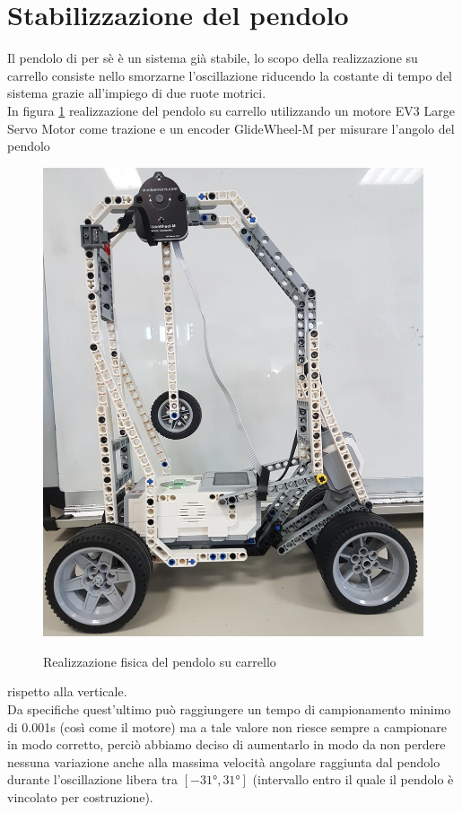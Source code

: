 \section{Stabilizzazione del pendolo}
Il pendolo di per sè è un sistema già stabile, lo scopo della realizzazione su carrello consiste nello smorzarne l'oscillazione riducendo la costante di tempo del sistema grazie all'impiego di due ruote motrici.\\
In figura \ref{pendoloFisico} realizzazione del pendolo su carrello utilizzando un motore EV3 Large Servo Motor come trazione e un encoder GlideWheel-M per misurare l'angolo del pendolo 
\begin{figure}[ht]
	\centering
	\includegraphics[scale=0.08]{pendoloFisico.jpg}\\
	\caption{Realizzazione fisica del pendolo su carrello}
	\label{pendoloFisico}
\end{figure} 
rispetto alla verticale.\\
Da specifiche quest'ultimo può raggiungere un tempo di campionamento minimo di 0.001s (così come il motore) ma a tale valore non riesce sempre a campionare in modo corretto, perciò abbiamo deciso di aumentarlo in modo da non perdere nessuna variazione anche alla massima velocità angolare raggiunta dal pendolo durante l'oscillazione libera tra $[\ang{-31},\ang{+31}]$ (intervallo entro il quale il pendolo è vincolato per costruzione).
